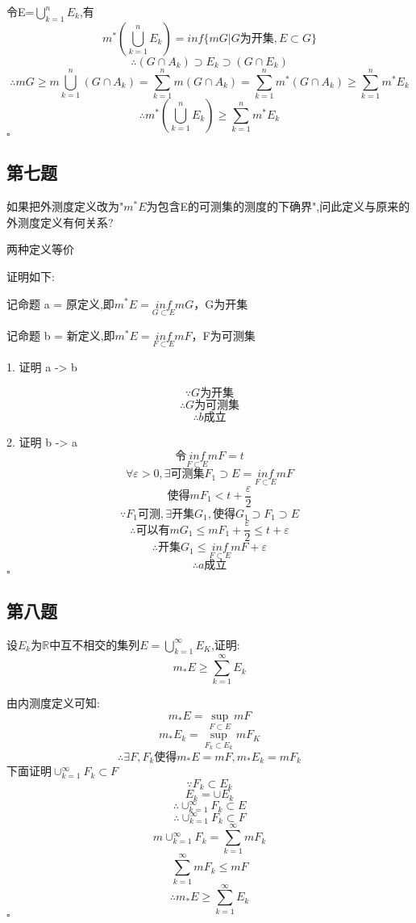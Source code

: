 \documentclass[a4paper]{article}
\begin{document}
    令E=$\bigcup_{k=1}^{n}E_k$,有
    \[m^*(\bigcup_{k=1}^{n}E_k)=inf\{mG|G\text{为开集},E\subset G\}\]
    \[\therefore (G\cap A_k) \supset E_k \supset (G\cap E_k)\]
    \[\therefore mG \ge m\bigcup_{k=1}^{n}(G\cap A_k)=\sum_{k=1}^{n}m(G \cap A_k) = \sum_{k=1}^{n}m^*(G \cap A_k) \ge \sum_{k=1}^{n}m^*E_k\]
    \[\therefore m^*(\bigcup_{k=1}^{n}E_k) \ge \sum_{k=1}^{n}m^*E_k\]
    \hfill $\square$

    \subsection{第七题}
    如果把外测度定义改为"$m^{*}E$为包含E的可测集的测度的下确界",问此定义与原来的外测度定义有何关系?

        两种定义等价

        证明如下:

        记命题 a = 原定义,即$m^{*}E=\underset{G\subset E}{inf}mG$，G为开集

        记命题 b = 新定义,即$m^{*}E=\underset{F\subset E}{inf}mF$，F为可测集

        1. 证明 a -> b

        \[\because G \text{为开集}\]
        \[\therefore G \text{为可测集}\]
        \[\therefore b\text{成立}\]

        2. 证明 b -> a
        \[令\underset{F\subset E}{inf}mF = t\]
        \[\forall \varepsilon >0,\exists \text{可测集}F_1 \supset E=\underset{F\subset E}{inf}mF\]
        \[\text{使得}mF_1<t+\frac{\varepsilon}{2}\]
        \[\because F_1 \text{可测},\exists \text{开集}G_1,\text{使得}G_1\supset F_1\supset E\]
        \[\therefore \text{可以有}mG_1 \le mF_1 + \frac{\varepsilon}{2} \le t + \varepsilon\]
        \[\therefore \text{开集}G_1 \le \underset{F\subset E}{inf}mF + \varepsilon\]
        \[\therefore a\text{成立}\]
    \hfill $\square$

    \subsection{第八题}
    设${E_k}$为$\mathbb{R}$中互不相交的集列$E=\bigcup_{k=1}^{\infty}E_K$,证明:
    \[m_{*}E\geq \sum_{k=1}^{\infty}E_k\]

        由内测度定义可知:   
        \[m_{*}E=\sup_{F\subset E}mF\]
        \[m_{*}E_k=\sup_{F_k\subset E_k}mF_K\]
        \[\therefore \exists F,F_k \text{使得}m_{*}E=mF,m_{*}E_k=mF_k\]
        下面证明$\cup_{k=1}^{\infty}F_k\subset F$
        \[\because F_k \subset E_k\]
        \[E_k=\cup E_k\]
        \[\therefore \cup_{k=1}^{\infty}F_k\subset E\]
        \[\therefore \cup_{k=1}^{\infty}F_k\subset F\]
        \[m\cup_{k=1}^{\infty}F_k = \sum_{k=1}^{\infty}mF_k\]
        \[\sum_{k=1}^{\infty}mF_k \le mF\]
        \[\therefore m_{*}E\geq \sum_{k=1}^{\infty}E_k\]
    \hfill $\square$
\end{document}
